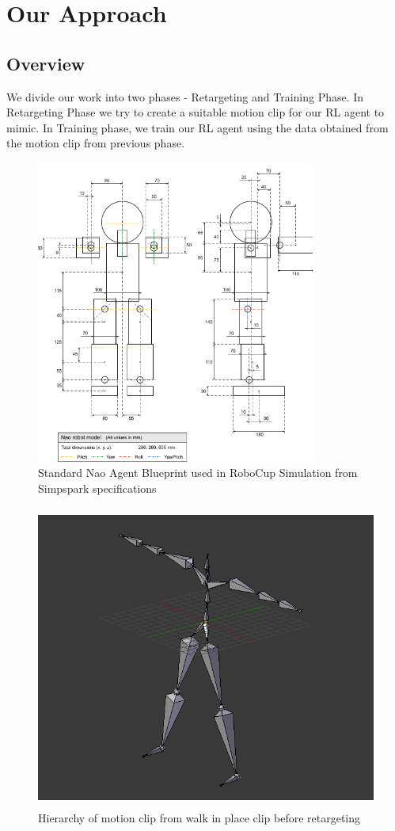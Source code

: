 \chapter{Our Approach}
\setlength{\parindent}{0em}

\section{Overview}
We divide our work into two phases - Retargeting and Training Phase.
In Retargeting Phase we try to create a suitable motion clip for our RL agent to mimic.
In Training phase, we train our RL agent using the data obtained from the motion clip from previous phase.
\begin{figure}
\centering
  \includegraphics[width=0.7\linewidth, height=10cm,keepaspectratio]{images/nao_param.png}
  \caption{Standard Nao Agent Blueprint used in RoboCup Simulation from Simpspark specifications}
  \label{fig:nao_params}
\end{figure}

\begin{figure}
\centering
  \includegraphics[width=0.7\linewidth, height=10cm,keepaspectratio]{images/mocap_hierarchy.png}
  \caption{Hierarchy of motion clip from walk in place clip before retargeting}
  \label{fig:mocap_hierarchy}
\end{figure}

